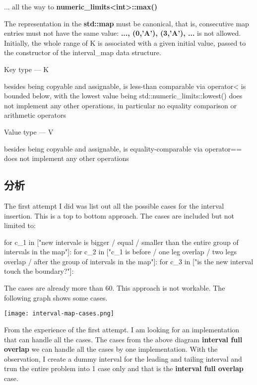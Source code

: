 ... all the way to \textbf{numeric_limits<int>::max()}

The representation in the \textbf{std::map} must be canonical, that is, consecutive map entries must not have the same value: \textbf{..., (0,'A'), (3,'A'), ...} is not allowed. Initially, the whole range of K is associated with a given initial value, passed to the constructor of the interval_map data structure.


Key type --- K

        besides being copyable and assignable, is less-than comparable via operator<
        is bounded below, with the lowest value being std::numeric_limits::lowest()
        does not implement any other operations, in particular no equality comparison or arithmetic operators

Value type --- V

        besides being copyable and assignable, is equality-comparable via operator==
        does not implement any other operations


\subsection{分析}
The first attempt I did was list out all the possible cases for the interval insertion. This is a top to bottom approach. The cases are included but not limited to:

\begin{Code}
for c_1 in ["new intervale is bigger / equal / smaller than the entire group of intervals in the map"]:
    for c_2 in ["c_1 is before / one leg overlap / two legs overlap / after the group of intervals in the map"]:
        for c_3 in ["is the new interval touch the boundary?"]:
\end{Code}

The cases are already more than 60. This approach is not workable. The following graph shows some cases.

\begin{center}
\texttt{[image: interval-map-cases.png]}\\
\label{fig:interval-map-cases}
\end{center}

From the experience of the first attempt. I am looking for an implementation that can handle all the cases. The cases from the above diagram \textbf{interval full overlap} we can handle all the cases by one implementation. With the observation, I create a dummy interval for the leading and tailing interval and trun the entire problem into 1 case only and that is the \textbf{interval full overlap} case.

